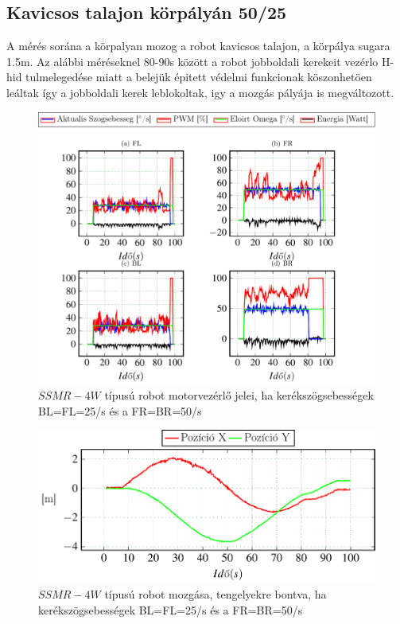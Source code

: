 \subsection{Kavicsos talajon körpályán 50/25}

A mérés sorána a körpalyan mozog a robot kavicsos talajon, a körpálya sugara 1.5m.
Az alábbi méréseknel 80-90s között a robot jobboldali kerekeit vezérlo H-hid tulmelegedése miatt a belejük épitett védelmi funkcionak köszonhetöen leáltak így a jobboldali kerek leblokoltak, igy a mozgás pályája is megváltozott.


\renewcommand{\GlobalPath}{Meresek/Mozgasok/NormalMukodes/Korpalya_07_03_Kavicsos/}
\renewcommand{\secondImage}{*}

%

%



\begin{figure}[H]
  \includegraphics{tikz/KorP0703x.pdf}
  \caption{$SSMR-4W$ típusú robot motorvezérlő jelei, ha kerékszögsebességek BL=FL=25\degree/s és a FR=BR=50\degree/s}
  \label{fig:KorP0703x}
\end{figure}


\begin{figure}[H]
  \includegraphics{tikz/KorP0703a.pdf}
  \caption{$SSMR-4W$ típusú robot mozgása, tengelyekre bontva, ha kerékszögsebességek BL=FL=25\degree/s és a FR=BR=50\degree/s }
  \label{fig:KorP0703a}
\end{figure}



